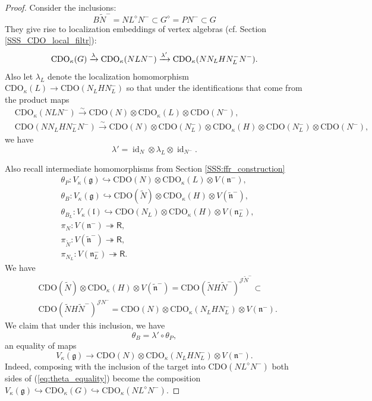 \documentclass{amsart}
\theoremstyle{definition}
\newcommand{\Ring}{\mathsf{R}}
\newcommand{\g}{\mathfrak{g}}
\newcommand{\lf}{\mathfrak{l}}
\newcommand{\Jet}{\mathscr{J}}
\newcommand{\CDO}{\mathrm{CDO}}
\numberwithin{equation}{section}
\begin{document}
\begin{proof}

Consider the inclusions:
\[
B\tilde{N}^-=NL^\diamond N^-\subset G^\diamond=PN^-\subset  G
\]
They give rise to localization embeddings of vertex algebras (cf. Section \ref{SSS_CDO_local_filtr}):
\[
\CDO_\kappa(G) \xrightarrow{\lambda} \CDO_\kappa(NLN^-) \xrightarrow{\lambda'} \textup{CDO}_\kappa(NN_LHN_L^-N^-).
\]
Also let $\lambda_L$ denote the localization homomorphism $\CDO_\kappa(L)\rightarrow 
\CDO(N_LHN_L^-)$ so that under the identifications that come from the product maps
\begin{align*}
&\CDO_\kappa(NLN^-)\xrightarrow{\sim} \CDO(N)\otimes \CDO_\kappa(L)\otimes \CDO(N^-), \\
&\CDO(NN_LHN_L^-N^-)\xrightarrow{\sim}
\CDO(N)\otimes \CDO(N^-_L)\otimes\CDO_\kappa(H)\otimes \CDO(N^-_L)\otimes \CDO(N^-),
\end{align*}
we have 
\begin{equation}\label{eq:lambda_formula}
\lambda'=\operatorname{id}_N\otimes\lambda_L\otimes \operatorname{id}_{N^-}.
\end{equation}

Also recall intermediate homomorphisms from Section \ref{SSS:ffr_construction}
\begin{align*}
&\theta_P:
V_{\kappa}(\g) \hookrightarrow \CDO(N) \otimes \CDO_\kappa(L)\otimes V(\mathfrak{n}^-),\\
&\theta_B:V_{\kappa}(\g) \hookrightarrow \CDO(\tilde{N}) \otimes \CDO_\kappa(H)\otimes V(\widetilde{\mathfrak{n}}^-),\\
&\theta_{B_L}: V_{\kappa}(\lf) \hookrightarrow \CDO(N_L) \otimes \CDO_\kappa(H)\otimes V(\mathfrak{n}_L^-),\\
&\pi_N:V(\mathfrak{n}^-)\twoheadrightarrow \Ring,\\
&\pi_{\widetilde{N}}: V(\widetilde{\mathfrak{n}}^-)\twoheadrightarrow \Ring,\\
&\pi_{N_L}:V(\mathfrak{n}_L^-)\twoheadrightarrow \Ring.
\end{align*}
We have 
\begin{equation}\label{eq:vertex_subalg}
\begin{split}
&\CDO(\widetilde{N})\otimes \CDO_\kappa(H)\otimes V(\widetilde{\mathfrak{n}}^-)=\CDO(\widetilde{N}H\widetilde{N}^-)^{\Jet \widetilde{N}^-}\subset\\& 
\CDO(\widetilde{N}H\widetilde{N}^-)^{\Jet N^-}=\CDO(N)\otimes \CDO_\kappa(N_LHN_L^-)\otimes V(\mathfrak{n}^-).
\end{split}
\end{equation}
We claim that under this inclusion, we have
\begin{equation}\label{eq:theta_equality}
\theta_B= \lambda'\circ\theta_P,
\end{equation} 
an equality of maps 
$$V_\kappa(\g)\rightarrow \CDO(N)\otimes \CDO_\kappa(N_LHN_L^-)\otimes V(\mathfrak{n}^-).$$
Indeed, composing with the inclusion of the target into $\CDO(NL^\diamond N^-)$ both sides of 
(\ref{eq:theta_equality}) become the composition 
$V_\kappa(\g)\hookrightarrow \CDO_\kappa(G)\hookrightarrow \CDO_\kappa(NL^\diamond N^-)$.


\end{proof}
\end{document}
